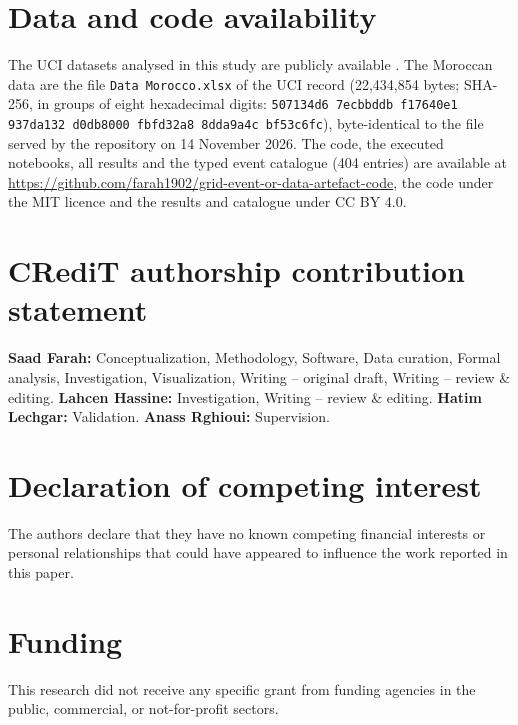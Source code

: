 \section*{Data and code availability}
\sloppy
The UCI datasets analysed in this study are publicly available \cite{bensalah2025uci,salam2018uci}. The Moroccan data are the file \texttt{Data Morocco.xlsx} of the UCI record (22,434,854 bytes; SHA-256, in groups of eight hexadecimal digits: \texttt{507134d6 7ecbbddb f17640e1 937da132 d0db8000 fbfd32a8 8dda9a4c bf53c6fc}), byte-identical to the file served by the repository on 14 November 2026. The code, the executed notebooks, all results and the typed event catalogue (404 entries) are available at \url{https://github.com/farah1902/grid-event-or-data-artefact-code}, the code under the MIT licence and the results and catalogue under CC BY 4.0.

\section*{CRediT authorship contribution statement}
\textbf{Saad Farah:} Conceptualization, Methodology, Software, Data curation, Formal analysis, Investigation, Visualization, Writing -- original draft, Writing -- review \& editing. \textbf{Lahcen Hassine:} Investigation, Writing -- review \& editing. \textbf{Hatim Lechgar:} Validation. \textbf{Anass Rghioui:} Supervision.

\section*{Declaration of competing interest}
The authors declare that they have no known competing financial interests or personal relationships that could have appeared to influence the work reported in this paper.

\section*{Funding}
This research did not receive any specific grant from funding agencies in the public, commercial, or not-for-profit sectors.
